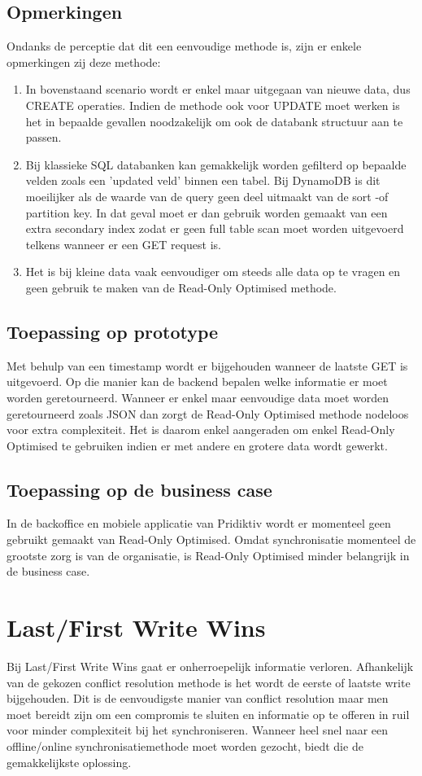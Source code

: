 \subsection{Opmerkingen}
Ondanks de perceptie dat dit een eenvoudige methode is, zijn er enkele opmerkingen zij deze methode:
\begin{enumerate}
\item In bovenstaand scenario wordt er enkel maar uitgegaan van nieuwe data, dus CREATE operaties. Indien de methode ook voor UPDATE moet werken is het in bepaalde gevallen noodzakelijk om ook de databank structuur aan te passen.
\item Bij klassieke SQL databanken kan gemakkelijk worden gefilterd op bepaalde velden zoals een 'updated veld' binnen een tabel. Bij DynamoDB is dit moeilijker als de waarde van de query geen deel uitmaakt van de sort -of partition key. In dat geval moet er dan gebruik worden gemaakt van een extra secondary index zodat er geen full table scan moet worden uitgevoerd telkens wanneer er een GET request is.
\item Het is bij kleine data vaak eenvoudiger om steeds alle data op te vragen en geen gebruik te maken van de Read-Only Optimised methode.
\end{enumerate}
\subsection{Toepassing op prototype}
Met behulp van een timestamp wordt er bijgehouden wanneer de laatste GET is uitgevoerd. Op die manier kan de backend bepalen welke informatie er moet worden geretourneerd. Wanneer er enkel maar eenvoudige data moet worden geretourneerd zoals JSON dan zorgt de Read-Only Optimised methode nodeloos voor extra complexiteit. Het is daarom enkel aangeraden om enkel Read-Only Optimised te gebruiken indien er met andere en grotere data wordt gewerkt.
\subsection{Toepassing op de business case}
In de backoffice en mobiele applicatie van Pridiktiv wordt er momenteel geen gebruikt gemaakt van Read-Only Optimised. Omdat synchronisatie momenteel de grootste zorg is van de organisatie, is Read-Only Optimised minder belangrijk in de business case.
\section{Last/First Write Wins}
Bij Last/First Write Wins gaat er onherroepelijk informatie verloren. Afhankelijk van de gekozen conflict resolution methode is het wordt de eerste of laatste write bijgehouden. Dit is de eenvoudigste manier van conflict resolution maar men moet bereidt zijn om een compromis te sluiten en informatie op te offeren in ruil voor minder complexiteit bij het synchroniseren. Wanneer heel snel naar een offline/online synchronisatiemethode moet worden gezocht, biedt die de gemakkelijkste oplossing.
